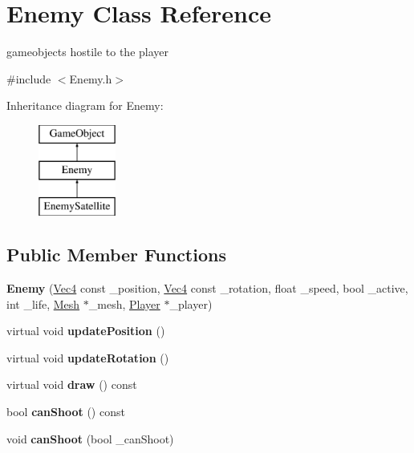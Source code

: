 \hypertarget{classEnemy}{}\section{Enemy Class Reference}
\label{classEnemy}


gameobjects hostile to the player  




{\ttfamily \#include $<$Enemy.\+h$>$}

Inheritance diagram for Enemy\+:\begin{figure}[H]
\begin{center}
\leavevmode
\includegraphics[height=3.000000cm]{classEnemy}
\end{center}
\end{figure}
\subsection*{Public Member Functions}
\begin{DoxyCompactItemize}
\item 
{\bfseries Enemy} (\hyperlink{classVec4}{Vec4} const \+\_\+position, \hyperlink{classVec4}{Vec4} const \+\_\+rotation, float \+\_\+speed, bool \+\_\+active, int \+\_\+life, \hyperlink{classMesh}{Mesh} $\ast$\+\_\+mesh, \hyperlink{classPlayer}{Player} $\ast$\+\_\+player)\hypertarget{classEnemy_ab74657627d71aa9644791fa8a2996f10}{}\label{classEnemy_ab74657627d71aa9644791fa8a2996f10}

\item 
virtual void {\bfseries update\+Position} ()\hypertarget{classEnemy_abca865a60e8134aa3fcfc4558de71587}{}\label{classEnemy_abca865a60e8134aa3fcfc4558de71587}

\item 
virtual void {\bfseries update\+Rotation} ()\hypertarget{classEnemy_a469a2e96ff4c742b7f4a13f1e12602a7}{}\label{classEnemy_a469a2e96ff4c742b7f4a13f1e12602a7}

\item 
virtual void {\bfseries draw} () const \hypertarget{classEnemy_a80f897d499f4caa87a161de4ba0ecde0}{}\label{classEnemy_a80f897d499f4caa87a161de4ba0ecde0}

\item 
bool {\bfseries can\+Shoot} () const \hypertarget{classEnemy_aec557d07779498d06946e448b4365bae}{}\label{classEnemy_aec557d07779498d06946e448b4365bae}

\item 
void {\bfseries can\+Shoot} (bool \+\_\+can\+Shoot)\hypertarget{classEnemy_a31998103d6c9d3aa5ed98ca9e2c11afb}{}\label{classEnemy_a31998103d6c9d3aa5ed98ca9e2c11afb}

\end{DoxyCompactItemize}
